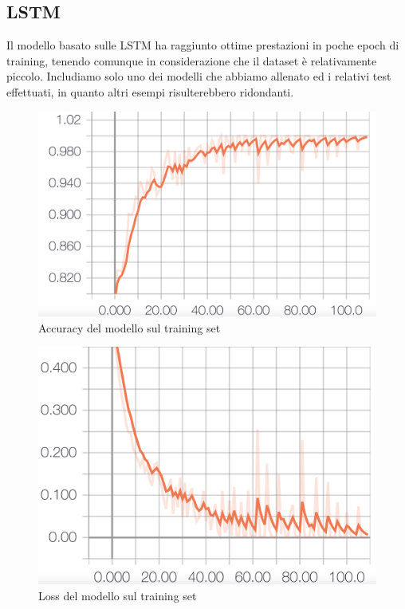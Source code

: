 \documentclass[8pt,notitlepage]{report}
\begin{document}
		\newpage		
		
		\subsection{LSTM}
		
			Il modello basato sulle LSTM ha raggiunto ottime prestazioni in poche epoch di training, tenendo comunque in considerazione che il dataset è relativamente piccolo. Includiamo solo uno dei modelli che abbiamo allenato ed i relativi test effettuati, in quanto altri esempi risulterebbero ridondanti. 
			\begin{figure}[H]
				\begin{center}
					\includegraphics[scale=.1865]{acc_Antonio}
					\caption{Accuracy del modello sul training set}
				\end{center}
			\end{figure}
			
			\begin{figure}[H]
				\begin{center}
					\includegraphics[scale=.1865]{loss_Antonio}
					\caption{Loss del modello sul training set}
				\end{center}
			\end{figure}
			
\end{document}
